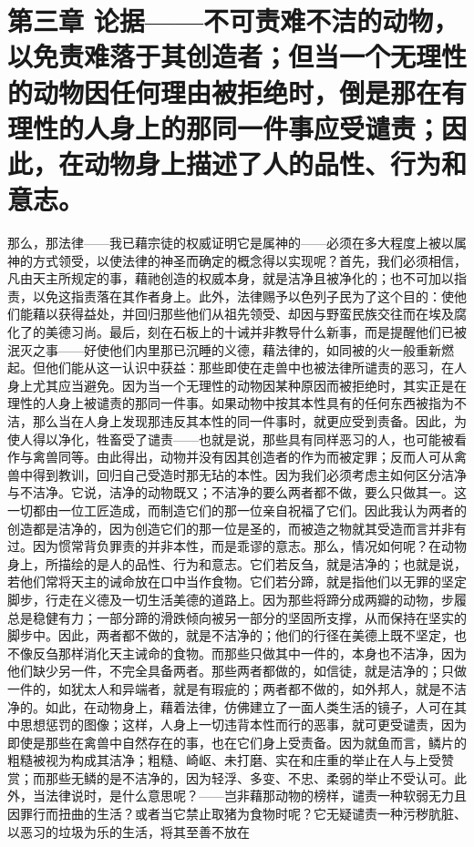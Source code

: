 
\section{第三章 论据——不可责难不洁的动物，以免责难落于其创造者；但当一个无理性的动物因任何理由被拒绝时，倒是那在有理性的人身上的那同一件事应受谴责；因此，在动物身上描述了人的品性、行为和意志。}

那么，那法律——我已藉宗徒的权威证明它是属神的——必须在多大程度上被以属神的方式领受，以使法律的神圣而确定的概念得以实现呢？首先，我们必须相信，凡由天主所规定的事，藉祂创造的权威本身，就是洁净且被净化的；也不可加以指责，以免这指责落在其作者身上。此外，法律赐予以色列子民为了这个目的：使他们能藉以获得益处，并回归那些他们从祖先领受、却因与野蛮民族交往而在埃及腐化了的美德习尚。最后，刻在石板上的十诫并非教导什么新事，而是提醒他们已被泯灭之事——好使他们内里那已沉睡的义德，藉法律的，如同被的火一般重新燃起。但他们能从这一认识中获益：那些即使在走兽中也被法律所谴责的恶习，在人身上尤其应当避免。因为当一个无理性的动物因某种原因而被拒绝时，其实正是在理性的人身上被谴责的那同一件事。如果动物中按其本性具有的任何东西被指为不洁，那么当在人身上发现那违反其本性的同一件事时，就更应受到责备。因此，为使人得以净化，牲畜受了谴责——也就是说，那些具有同样恶习的人，也可能被看作与禽兽同等。由此得出，动物并没有因其创造者的作为而被定罪；反而人可从禽兽中得到教训，回归自己受造时那无玷的本性。因为我们必须考虑主如何区分洁净与不洁净。它说，洁净的动物既又；不洁净的要么两者都不做，要么只做其一。这一切都由一位工匠造成，而制造它们的那一位亲自祝福了它们。因此我认为两者的创造都是洁净的，因为创造它们的那一位是圣的，而被造之物就其受造而言并非有过。因为惯常背负罪责的并非本性，而是乖谬的意志。那么，情况如何呢？在动物身上，所描绘的是人的品性、行为和意志。它们若反刍，就是洁净的；也就是说，若他们常将天主的诫命放在口中当作食物。它们若分蹄，就是指他们以无罪的坚定脚步，行走在义德及一切生活美德的道路上。因为那些将蹄分成两瓣的动物，步履总是稳健有力；一部分蹄的滑跌倾向被另一部分的坚固所支撑，从而保持在坚实的脚步中。因此，两者都不做的，就是不洁净的；他们的行径在美德上既不坚定，也不像反刍那样消化天主诫命的食物。而那些只做其中一件的，本身也不洁净，因为他们缺少另一件，不完全具备两者。那些两者都做的，如信徒，就是洁净的；只做一件的，如犹太人和异端者，就是有瑕疵的；两者都不做的，如外邦人，就是不洁净的。如此，在动物身上，藉着法律，仿佛建立了一面人类生活的镜子，人可在其中思想惩罚的图像；这样，人身上一切违背本性而行的恶事，就可更受谴责，因为即使是那些在禽兽中自然存在的事，也在它们身上受责备。因为就鱼而言，鳞片的粗糙被视为构成其洁净；粗糙、崎岖、未打磨、实在和庄重的举止在人与上受赞赏；而那些无鳞的是不洁净的，因为轻浮、多变、不忠、柔弱的举止不受认可。此外，当法律说时，是什么意思呢？——岂非藉那动物的榜样，谴责一种软弱无力且因罪行而扭曲的生活？或者当它禁止取猪为食物时呢？它无疑谴责一种污秽肮脏、以恶习的垃圾为乐的生活，将其至善不放在